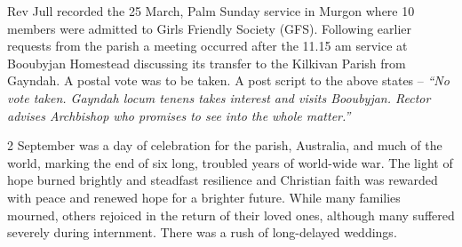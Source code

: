 Rev Jull recorded the 25 March, Palm Sunday service in Murgon where 10 members were admitted to Girls Friendly Society (GFS). Following earlier requests from the parish a meeting occurred after the 11.15 am service at Booubyjan Homestead discussing its transfer to the Kilkivan Parish from Gayndah. A postal vote was to be taken. A post script to the above states -- \emph{``No vote taken. Gayndah locum tenens takes interest and visits Booubyjan. Rector advises Archbishop who promises to see into the whole matter.''}



2 September was a day of celebration for the parish, Australia, and much of the world, marking the end of six long, troubled years of world-wide war. The light of hope burned brightly and steadfast resilience and Christian faith was rewarded with peace and renewed hope for a brighter future. While many families mourned, others rejoiced in the return of their loved ones, although many suffered severely during internment. There was a rush of long-delayed weddings.









